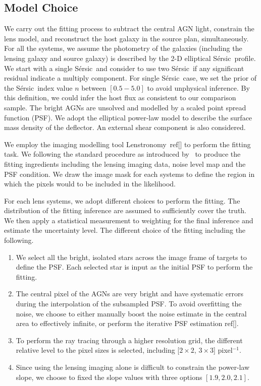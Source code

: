 \documentclass[fleqn,usenatbib]{mnras}
\newcommand{\sersic}{S\'ersic}
\newcommand{\lenstronomy}{{\sc Lenstronomy}}
\begin{document}
\subsection{Model Choice}
We carry out the fitting process to subtract the central AGN light, constrain the lens model, and reconstruct the host galaxy in the source plan, simultaneously.
For all the systems, we assume the photometry of the galaxies (including the lensing galaxy and source galaxy) is described by the 2-D elliptical \sersic\ profile. We start with a single \sersic\ and consider to use two \sersic\ if any significant residual indicate a multiply component. For single \sersic\ case, we set the prior of the \sersic\ index value $n$ between $[0.5-5.0]$ to avoid unphysical inference. By this definition, we could infer the host flux as consistent to our comparison sample. The bright AGNs are unsolved and modelled by a scaled point spread function (PSF). We adopt the elliptical power-law model to describe the surface mass density of the deflector. An external shear component is also considered.

We employ the imaging modelling tool \lenstronomy~ref[] to perform the fitting task. We following the standard procedure as introduced by~\citet{Ding2020} to produce the fitting ingredients including the lensing imaging data, noise level map and the PSF condition. We draw the image mask for each systems to define the region in which the pixels would to be included in the likelihood.

For each lens systems, we adopt different choices to perform the fitting. The distribution of the fitting inference are assumed to sufficiently cover the truth. We then apply a statistical measurement to weighting for the final inference and estimate the uncertainty level. The different choice of the fitting including the following.
\begin{enumerate}
\item  We select all the bright, isolated stars across the image frame of targets to define the PSF. Each selected star is input as the initial PSF to perform the fitting.
\item The central pixel of the AGNs are very bright and have systematic errors during the interpolation of the subsampled PSF. To avoid overfitting the noise, we choose to either manually boost the noise estimate in the central area to effectively infinite, or perform the iterative PSF estimation ref[].
\item To perform the ray tracing through a higher resolution grid, the different relative level to the pixel sizes is selected, including [$2\times2$, $3\times3$] pixel$^{-1}$.
\item Since using the lensing imaging alone is difficult to constrain the power-law slope, we choose to fixed the slope values with three options $[1.9, 2.0, 2.1]$.
\end{enumerate}
\end{document}
